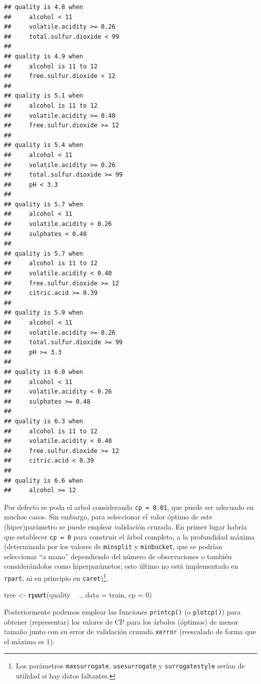 \documentclass[]{book}
\newenvironment{Shaded}{\begin{snugshade}}{\end{snugshade}}
\newcommand{\KeywordTok}[1]{\textcolor[rgb]{0.13,0.29,0.53}{\textbf{#1}}}
\newcommand{\DataTypeTok}[1]{\textcolor[rgb]{0.13,0.29,0.53}{#1}}
\newcommand{\DecValTok}[1]{\textcolor[rgb]{0.00,0.00,0.81}{#1}}
\newcommand{\StringTok}[1]{\textcolor[rgb]{0.31,0.60,0.02}{#1}}
\newcommand{\OperatorTok}[1]{\textcolor[rgb]{0.81,0.36,0.00}{\textbf{#1}}}
\newcommand{\NormalTok}[1]{#1}
\theoremstyle{break}
\theoremstyle{definition}
\theoremstyle{definition}
\theoremstyle{definition}
\theoremstyle{remark}
\begin{document}
\begin{verbatim}
## quality is 4.8 when
##     alcohol < 11
##     volatile.acidity >= 0.26
##     total.sulfur.dioxide < 99
## 
## quality is 4.9 when
##     alcohol is 11 to 12
##     free.sulfur.dioxide < 12
## 
## quality is 5.1 when
##     alcohol is 11 to 12
##     volatile.acidity >= 0.40
##     free.sulfur.dioxide >= 12
## 
## quality is 5.4 when
##     alcohol < 11
##     volatile.acidity >= 0.26
##     total.sulfur.dioxide >= 99
##     pH < 3.3
## 
## quality is 5.7 when
##     alcohol < 11
##     volatile.acidity < 0.26
##     sulphates < 0.48
## 
## quality is 5.7 when
##     alcohol is 11 to 12
##     volatile.acidity < 0.40
##     free.sulfur.dioxide >= 12
##     citric.acid >= 0.39
## 
## quality is 5.9 when
##     alcohol < 11
##     volatile.acidity >= 0.26
##     total.sulfur.dioxide >= 99
##     pH >= 3.3
## 
## quality is 6.0 when
##     alcohol < 11
##     volatile.acidity < 0.26
##     sulphates >= 0.48
## 
## quality is 6.3 when
##     alcohol is 11 to 12
##     volatile.acidity < 0.40
##     free.sulfur.dioxide >= 12
##     citric.acid < 0.39
## 
## quality is 6.6 when
##     alcohol >= 12
\end{verbatim}

Por defecto se poda el arbol considerando \texttt{cp\ =\ 0.01}, que
puede ser adecuado en muchos casos. Sin embargo, para seleccionar el
valor óptimo de este (hiper)parámetro se puede emplear validación
cruzada. En primer lugar habría que establecer \texttt{cp\ =\ 0} para
construir el árbol completo, a la profundidad máxima (determinada por
los valores de \texttt{minsplit} y \texttt{minbucket}, que se podrían
seleccionar ``a mano'' dependiendo del número de observaciones o también
considerándolos como hiperparámetos; esto último no está implementado en
\texttt{rpart}, ni en principio en \texttt{caret})\footnote{Los
  parámetros \texttt{maxsurrogate}, \texttt{usesurrogate} y
  \texttt{surrogatestyle} serían de utilidad si hay datos faltantes.}.

\begin{Shaded}
\begin{Highlighting}[]
\NormalTok{tree <-}\StringTok{ }\KeywordTok{rpart}\NormalTok{(quality }\OperatorTok{~}\StringTok{ }\NormalTok{., }\DataTypeTok{data =}\NormalTok{ train, }\DataTypeTok{cp =} \DecValTok{0}\NormalTok{)}
\end{Highlighting}
\end{Shaded}

Posteriormente podemos emplear las funciones \texttt{printcp()} (o
\texttt{plotcp()}) para obtener (representar) los valores de CP para los
árboles (óptimos) de menor tamaño junto con su error de validación
cruzada \texttt{xerror} (reescalado de forma que el máximo es 1):
\end{document}
